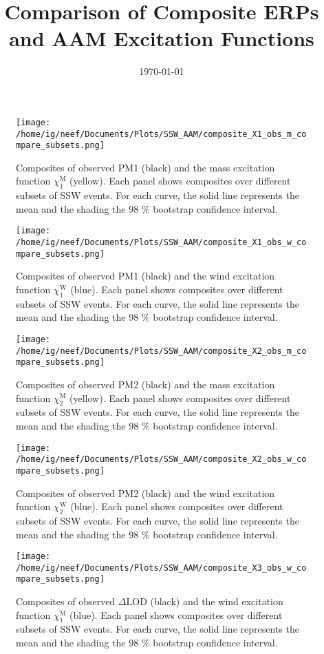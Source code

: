 \documentclass[11pt]{article}
\title{Comparison of Composite ERPs and AAM Excitation Functions}
\date{\today}
\newcommand{\dlod}{{\Delta \text{LOD}}}
\newcommand{\xm}{\chi^{\text{M}}}
\newcommand{\xw}{\chi^{\text{W}}}
\begin{document}
\maketitle   



\begin{figure}
  \noindent
  \texttt{[image: /home/ig/neef/Documents/Plots/SSW\_AAM/composite\_X1\_obs\_m\_compare\_subsets.png]}
  \caption{Composites of observed PM1 (black) and the mass excitation function $\xm_1$ (yellow).  Each panel shows composites over different subsets of SSW events. For each curve, the solid line represents the mean and the shading the 98 $\%$ bootstrap confidence interval.}
   \label{fig:all_events}
 \end{figure}

\begin{figure}
  \noindent
  \texttt{[image: /home/ig/neef/Documents/Plots/SSW\_AAM/composite\_X1\_obs\_w\_compare\_subsets.png]}
  \caption{Composites of observed PM1 (black) and the wind excitation function $\xw_1$ (blue).  Each panel shows composites over different subsets of SSW events. For each curve, the solid line represents the mean and the shading the 98 $\%$ bootstrap confidence interval.}
   \label{fig:all_events}
 \end{figure}

\begin{figure}
  \noindent
  \texttt{[image: /home/ig/neef/Documents/Plots/SSW\_AAM/composite\_X2\_obs\_m\_compare\_subsets.png]}
  \caption{Composites of observed PM2 (black) and the mass excitation function $\xm_2$ (yellow).  Each panel shows composites over different subsets of SSW events. For each curve, the solid line represents the mean and the shading the 98 $\%$ bootstrap confidence interval.}
   \label{fig:all_events}
 \end{figure}

\begin{figure}
  \noindent
  \texttt{[image: /home/ig/neef/Documents/Plots/SSW\_AAM/composite\_X2\_obs\_w\_compare\_subsets.png]}
  \caption{Composites of observed PM2 (black) and the wind excitation function $\xw_2$ (blue).  Each panel shows composites over different subsets of SSW events. For each curve, the solid line represents the mean and the shading the 98 $\%$ bootstrap confidence interval.}
   \label{fig:all_events}
 \end{figure}

\begin{figure}
  \noindent
  \texttt{[image: /home/ig/neef/Documents/Plots/SSW\_AAM/composite\_X3\_obs\_w\_compare\_subsets.png]}
  \caption{Composites of observed $\dlod$ (black) and the wind excitation function $\xm_1$ (blue).  Each panel shows composites over different subsets of SSW events. For each curve, the solid line represents the mean and the shading the 98 $\%$ bootstrap confidence interval.}
   \label{fig:all_events}
 \end{figure}
\end{document}
